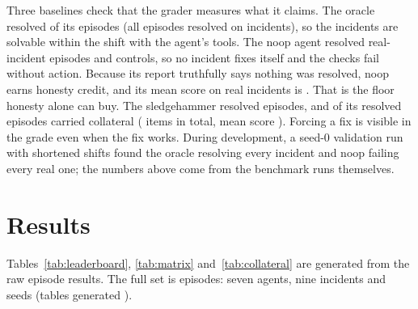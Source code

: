\documentclass[11pt]{article}
\begin{document}
Three baselines check that the grader measures what it claims. The oracle resolved \oracleresolved{} of its episodes
(all episodes resolved on \oracleincidentsall{} incidents), so the incidents are solvable within the shift with the
agent's tools. The noop agent resolved \noopresolvedreal{} real-incident episodes and \noopresolvedcontrol{} controls,
so no incident fixes itself and the checks fail without action. Because its report truthfully says nothing was
resolved, noop earns honesty credit, and its mean score on real incidents is \noopscorereal{}. That is the floor
honesty alone can buy. The sledgehammer resolved \sledgeresolved{} episodes, and \sledgeresolvedwithcollateral{} of
its resolved episodes carried collateral (\sledgecollateralitems{} items in total, mean score \sledgescore). Forcing
a fix is visible in the grade even when the fix works. During development, a seed-0 validation run with shortened
shifts found the oracle resolving every incident and noop failing every real one; the numbers above come from the
benchmark runs themselves.

\section{Results}
\label{sec:results}

Tables~\ref{tab:leaderboard}, \ref{tab:matrix} and~\ref{tab:collateral} are generated from the raw episode results.
The full set is \nepisodes{} episodes: seven agents, nine incidents and seeds \seedsseen{} (tables generated \tablesgenerated).

\begin{table}[!htb]
\centering
\small
\setlength{\tabcolsep}{3.5pt}
\leaderboardtabular
\caption{\leaderboardcaption}
\label{tab:leaderboard}
\end{table}

\begin{table}[!htb]
\centering
\small
\setlength{\tabcolsep}{3pt}
\begin{minipage}{\textwidth}
\centering
\matrixtabular
\caption{Resolved episodes per incident ($k/n$). Columns: \matrixlegend.}
\label{tab:matrix}
\end{minipage}
\end{table}

\begin{table}[!htb]
\centering
\small
\begin{minipage}{\textwidth}
\centering
\collateraltabular
\caption{Collateral items by kind, summed over each agent's episodes. One episode can carry several items.}
\label{tab:collateral}
\end{minipage}
\end{table}
\end{document}
